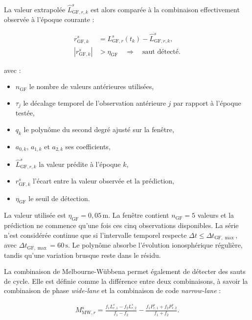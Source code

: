 La valeur extrapolée $\widehat L_{\mathrm{GF},r,k}^s$ est alors comparée à la
combinaison effectivement observée à l'époque courante :

\begin{align}
r_{\mathrm{GF},k}^s
&=
L_{\mathrm{GF},r}^s(t_k)-\widehat L_{\mathrm{GF},r,k}^s,
\\
\left|r_{\mathrm{GF},k}^s\right|
&>\eta_{\mathrm{GF}}
\quad\Longrightarrow\quad
\text{saut détecté}.
\label{ppp:eq:geometry_free_detection}
\end{align}

avec :

\begin{itemize}
    \item $n_{\mathrm{GF}}$ le nombre de valeurs antérieures utilisées,
    \item $\tau_j$ le décalage temporel de l'observation antérieure $j$ par
    rapport à l'époque testée,
    \item $q_k$ le polynôme du second degré ajusté sur la fenêtre,
    \item $a_{0,k}$, $a_{1,k}$ et $a_{2,k}$ ses coefficients,
    \item $\widehat L_{\mathrm{GF},r,k}^s$ la valeur prédite à l'époque $k$,
    \item $r_{\mathrm{GF},k}^s$ l'écart entre la valeur observée et la
    prédiction,
    \item $\eta_{\mathrm{GF}}$ le seuil de détection.
\end{itemize}

La valeur utilisée est $\eta_{\mathrm{GF}}=0{,}05\,\mathrm{m}$. La fenêtre
contient $n_{\mathrm{GF}}=5$ valeurs et la prédiction ne commence qu'une fois
ces cinq observations disponibles. La série n'est considérée continue que si
l'intervalle temporel respecte
$\Delta t\leq\Delta t_{\mathrm{GF},\max}$, avec
$\Delta t_{\mathrm{GF},\max}=60\,\mathrm{s}$. Le polynôme absorbe
l'évolution ionosphérique régulière, tandis qu'une variation brusque reste
dans le résidu.

La combinaison de Melbourne-Wübbena permet également de détecter des sauts de cycle.
Elle est définie comme la différence entre deux combinaisons, à savoir la combinaison de phase
\textit{wide-lane} et la combinaison de code \textit{narrow-lane} :

\begin{align}
M_{\mathrm{MW},r}^s
=
\frac{f_1L_{r,1}^s-f_2L_{r,2}^s}{f_1-f_2}
-
\frac{f_1P_{r,1}^s+f_2P_{r,2}^s}{f_1+f_2}.
\label{ppp:eq:melbourne_wubbena_slip}
\end{align}

